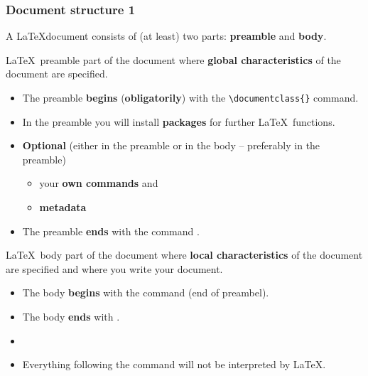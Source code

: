 \begin{frame}[fragile]
\frametitle{Document structure 1}

A \LaTeX document consists of (at least) two parts: \textbf{preamble} and \textbf{body}.

\begin{block}{\LaTeX\ preamble}
	part of the document where \textbf{global characteristics} of the document are specified.
\end{block}

	\begin{itemize}
		\item The preamble \textbf{begins} (\textbf{obligatorily}) with the \lstinline|\documentclass{}| command.
		
		\item In the preamble you will install \textbf{packages} for further \LaTeX\ functions.
		
		\item \textbf{Optional} (either in the preamble or in the body -- preferably in the preamble)

		\begin{itemize}
			\item your \textbf{own commands} and 
			
			\item \textbf{metadata} 
		\end{itemize}
		
		\item The preamble \textbf{ends} with the command  \lstinline||.
		
	\end{itemize}

\end{frame}


\begin{frame}[fragile]


\begin{block}{\LaTeX\ body}
	part of the document where \textbf{local characteristics} of the document are specified and where you write your document.
\end{block}


\begin{itemize}
	
	\item The body \textbf{begins} with the \lstinline|| command  (end of preambel).
	
	\item The body \textbf{ends} with \lstinline||. 
	
	\item[]
	
	\item Everything following the command \lstinline|| will not be interpreted by \LaTeX .
\end{itemize}

\end{frame}


